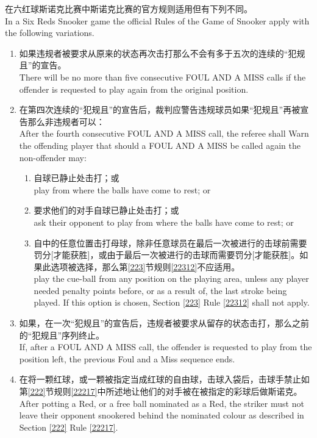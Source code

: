 \noindent 在六红球斯诺克比赛中斯诺克比赛的官方规则适用但有下列不同。\\
In a Six Reds Snooker game the official Rules of the Game of 
Snooker apply with the following variations.
\begin{enumerate}[label=(\alph*)]
    \item 如果违规者被要求从原来的状态再次击打那么不会有多于五次的连续的“犯规且\miss{}”的宣告。\\
    There will be no more than five consecutive FOUL AND A MISS calls if the offender is requested to play again from the original position.
    \item 在第四次连续的“犯规且\miss{}”的宣告后，裁判应警告违规球员如果“犯规且\miss{}”再被宣告那么非违规者可以：\\
    After the fourth consecutive FOUL AND A MISS call, the referee shall Warn the offending player that should a FOUL AND A MISS be called again the non-offender may:
    \begin{enumerate}[label=(\roman*)]
        \item 自球已静止处击打；或\\
        play from where the balls have come to rest; or
        \item 要求他们的对手自球已静止处击打；或\\
        ask their opponent to play from where the balls have come to rest; or
        \item 自\playingarea{}中的任意位置击打母球，除非任意球员在最后一次被进行的击球前需要罚分[才能获胜]，或由于最后一次被进行的击球而需要罚分[才能获胜]。如果此选项被选择，那么第\ref{223}节规则\ref{22312}不应适用。\\
        play the cue-ball from any position on the playing area, unless any player needed penalty points before, or as a result of, the last stroke being played. If this option is chosen, Section \ref{223} Rule \ref{22312} shall not apply.
    \end{enumerate}
    \item 如果，在一次“犯规且\miss{}”的宣告后，违规者被要求从留存的状态击打，那么之前的“犯规且\miss{}”序列终止。\\
    If, after a FOUL AND A MISS call, the offender is requested to play from the position left, the previous Foul and a Miss sequence ends.
    \item 在将一颗红球，或一颗被指定当成红球的自由球，击球入袋后，击球手禁止如第\ref{222}节规则\ref{22217}中所述地让他们的对手被在被指定的彩球后做斯诺克。\\
    After potting a Red, or a free ball nominated as a Red, the striker must not leave their opponent snookered behind the nominated colour as described in Section \ref{222} Rule \ref{22217}.
\end{enumerate}

